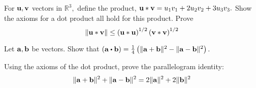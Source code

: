\begin{enumialphparenastyle}
\begin{ex} For ${\bf u},{\bf v}$ vectors in $\mathbb{R}^{3},$ define the product, 
${\bf u}\ast {\bf v} =  u_{1}v_{1}+2u_{2}v_{2}+3u_{3}v_{3}.$ Show the axioms
for a dot product all hold for this product. Prove
\begin{equation*}
\| {\bf u}\ast {\bf v}\| \leq \left( {\bf u}\ast {\bf u}\right)
^{1/2}\left( {\bf v}\ast {\bf v}\right) ^{1/2}
\end{equation*}
\end{ex}


\begin{ex} Let ${\bf a},{\bf b}$ be vectors. Show that $\left( \vect{a}\dotprod \vect{b}\right) =\frac{1}{4}\left( \vectlength
\vect{a}+\vect{b}\vectlength ^{2}-\vectlength \vect{a}-\vect{b}\vectlength ^{2}\right) .$
\end{ex}

\begin{ex} Using the axioms of the dot product, prove the parallelogram identity: 
\begin{equation*}
\| {\bf a}+{\bf b}\| ^{2}+\| {\bf a}-{\bf b}\|
^{2}=2\| {\bf a}\| ^{2}+2\| {\bf b}
\| ^{2}
\end{equation*}
\end{ex}

\end{enumialphparenastyle}